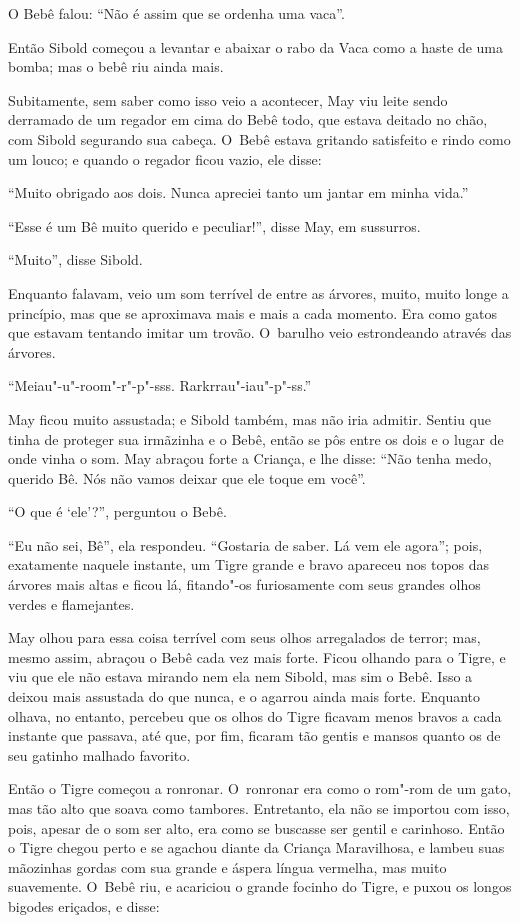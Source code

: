 O Bebê falou: ``Não é assim que se ordenha uma vaca''.

Então Sibold começou a levantar e abaixar o rabo da Vaca como a haste de
uma bomba; mas o bebê riu ainda mais.

Subitamente, sem saber como isso veio a acontecer, May viu 
leite sendo derramado de um regador em cima do Bebê todo, que estava deitado no chão,
com Sibold segurando sua cabeça. O~Bebê estava gritando satisfeito e
rindo como um louco; e quando o regador ficou vazio, ele disse:

``Muito obrigado aos dois. Nunca apreciei tanto um jantar em minha
vida.''

``Esse é um Bê muito querido e peculiar!'', disse May, em sussurros.

``Muito'', disse Sibold.

Enquanto falavam, veio um som terrível de entre as árvores, muito, muito
longe a princípio, mas que se aproximava mais e mais a cada momento. Era
como gatos que estavam tentando imitar um trovão. O~barulho veio
estrondeando através das árvores.

``Meiau"-u"-room"-r"-p"-sss. Rarkrrau"-iau"-p"-ss.''

May ficou muito assustada; e Sibold também, mas não iria admitir.
Sentiu que tinha de proteger sua irmãzinha e o Bebê, então se pôs entre
os dois e o lugar de onde vinha o som. May abraçou forte a Criança, e
lhe disse: ``Não tenha medo, querido Bê. Nós não vamos deixar que ele toque
em você''.

``O que é `ele'?'', perguntou o Bebê.

``Eu não sei, Bê'', ela respondeu. ``Gostaria de saber. Lá vem ele
agora''; pois, exatamente naquele instante, um Tigre grande e bravo
apareceu nos topos das árvores mais altas e ficou lá, fitando"-os
furiosamente com seus grandes olhos verdes e flamejantes.

May olhou para essa coisa terrível com seus olhos arregalados de terror;
mas, mesmo assim, abraçou o Bebê cada vez mais forte. Ficou olhando para
o Tigre, e viu que ele não estava mirando nem ela nem Sibold, mas sim o
Bebê. Isso a deixou mais assustada do que nunca, e o agarrou ainda
mais forte. Enquanto olhava, no entanto, percebeu que os olhos do Tigre
ficavam menos bravos a cada instante que passava, até que, por fim,
ficaram tão gentis e mansos quanto os de seu gatinho malhado favorito.

Então o Tigre começou a ronronar. O~ronronar era como o rom"-rom de um
gato, mas tão alto que soava como tambores. Entretanto, ela não se
importou com isso, pois, apesar de o som ser alto, era como se buscasse
ser gentil e carinhoso. Então o Tigre chegou perto e se agachou diante da
Criança Maravilhosa, e lambeu suas mãozinhas gordas com sua grande e
áspera língua vermelha, mas muito suavemente. O~Bebê riu, e acariciou o
grande focinho do Tigre, e puxou os longos bigodes eriçados, e disse:

